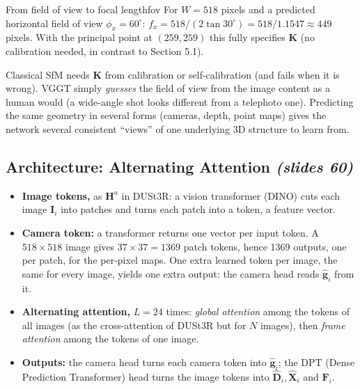 \documentclass[11pt,a4paper]{article}
\newcommand{\slr}[1]{\texorpdfstring{\emph{(slides #1)}}{(slides #1)}}
\begin{document}
\begin{example}{From field of view to focal length}{fov}
For $W=518$ pixels and a predicted horizontal field of view $\phi_x=60^\circ$: $f_x=518/(2\tan30^\circ)=518/1.1547\approx449$ pixels. With the principal point at $(259,259)$ this fully specifies $\bm K$ (no calibration needed, in contrast to Section 5.1).
\end{example}

\begin{intuition}
Classical SfM needs $\bm K$ from calibration or self-calibration (and fails when it is wrong). VGGT simply \emph{guesses} the field of view from the image content as a human would (a wide-angle shot looks different from a telephoto one). Predicting the same geometry in several forms (cameras, depth, point maps) gives the network several consistent ``views'' of one underlying 3D structure to learn from.
\end{intuition}

\subsection{Architecture: Alternating Attention \slr{60}}
\begin{itemize}
\item \textbf{Image tokens,} as $\bm H^a$ in DUSt3R: a vision transformer (DINO) cuts each image $\bm I_i$ into patches and turns each patch into a token, a feature vector.
\item \textbf{Camera token:} a transformer returns one vector per input token. A $518\times518$ image gives $37\times37=1369$ patch tokens, hence 1369 outputs, one per patch, for the per-pixel maps. One extra learned token per image, the same for every image, yields one extra output: the camera head reads $\hat{\bm g}_i$ from it.
\item \textbf{Alternating attention,} $L=24$ times: \emph{global attention} among the tokens of all images (as the cross-attention of DUSt3R but for $N$ images), then \emph{frame attention} among the tokens of one image.
\item \textbf{Outputs:} the camera head turns each camera token into $\hat{\bm g}_i$; the DPT (Dense Prediction Transformer) head turns the image tokens into $\hat{\bm D}_i,\hat{\bm X}_i$ and $\bm F_i$.
\end{itemize}
\end{document}

